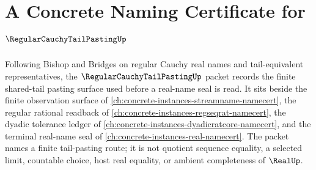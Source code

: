 \chapter{A Concrete Naming Certificate for $\RegularCauchyTailPastingUp$}
\label{ch:concrete-instances-regular-cauchy-tail-pasting-namecert}

Following Bishop and Bridges on regular Cauchy real names and tail-equivalent representatives, the $\RegularCauchyTailPastingUp$ packet records the finite shared-tail pasting surface used before a real-name seal is read. It sits beside the finite observation surface of \autoref{ch:concrete-instances-streamname-namecert}, the regular rational readback of \autoref{ch:concrete-instances-regseqrat-namecert}, the dyadic tolerance ledger of \autoref{ch:concrete-instances-dyadicratcore-namecert}, and the terminal real-name seal of \autoref{ch:concrete-instances-real-namecert}. The packet names a finite tail-pasting route; it is not quotient sequence equality, a selected limit, countable choice, host real equality, or ambient completeness of $\RealUp$.

